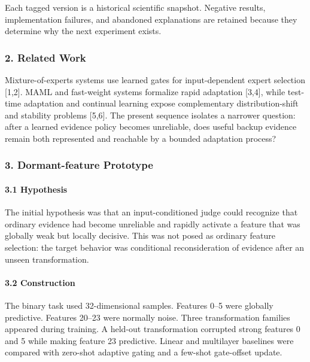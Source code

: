 \documentclass[
  10pt,
]{article}
\begin{document}
Each tagged version is a historical scientific snapshot. Negative
results, implementation failures, and abandoned explanations are
retained because they determine why the next experiment exists.

\hypertarget{related-work}{%
\subsubsection{2. Related Work}\label{related-work}}

Mixture-of-experts systems use learned gates for input-dependent expert
selection {[}1,2{]}. MAML and fast-weight systems formalize rapid
adaptation {[}3,4{]}, while test-time adaptation and continual learning
expose complementary distribution-shift and stability problems
{[}5,6{]}. The present sequence isolates a narrower question: after a
learned evidence policy becomes unreliable, does useful backup evidence
remain both represented and reachable by a bounded adaptation process?

\hypertarget{dormant-feature-prototype}{%
\subsubsection{3. Dormant-feature
Prototype}\label{dormant-feature-prototype}}

\hypertarget{hypothesis}{%
\paragraph{3.1 Hypothesis}\label{hypothesis}}

The initial hypothesis was that an input-conditioned judge could
recognize that ordinary evidence had become unreliable and rapidly
activate a feature that was globally weak but locally decisive. This was
not posed as ordinary feature selection: the target behavior was
conditional reconsideration of evidence after an unseen transformation.

\hypertarget{construction}{%
\paragraph{3.2 Construction}\label{construction}}

The binary task used 32-dimensional samples. Features 0--5 were globally
predictive. Features 20--23 were normally noise. Three transformation
families appeared during training. A held-out transformation corrupted
strong features 0 and 5 while making feature 23 predictive. Linear and
multilayer baselines were compared with zero-shot adaptive gating and a
few-shot gate-offset update.
\end{document}
